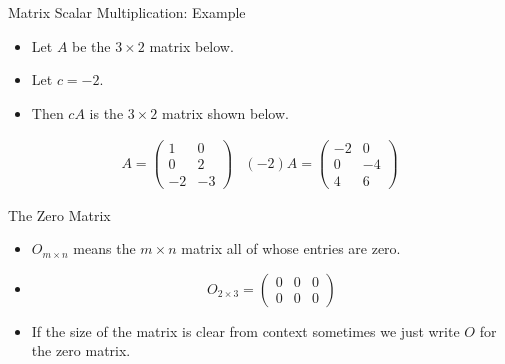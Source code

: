 \documentclass{beamer}
\begin{document}
\begin{frame}{Matrix Scalar Multiplication: Example}

\begin{itemize}
\item Let $A$ be the $3\times 2$ matrix below.
\item Let $c = -2$.
\item Then $cA$ is the $3\times 2$ matrix shown below.
\end{itemize}

$$
\begin{matrix}
A =

\begin{pmatrix}
1 & 0 \\
0 & 2 \\
-2 & -3
\end{pmatrix}

&

(-2) A =

\begin{pmatrix}
-2 & 0 \\
0 & -4 \\
4 &  6
\end{pmatrix}

\end{matrix}
$$

\end{frame}


\begin{frame}{The Zero Matrix}

\begin{itemize}
\item $O_{m\times n}$ means the $m\times n$ matrix all of whose entries are zero.
\item
$$O_{2\times 3} =
\begin{pmatrix}
0 & 0 & 0 \\
0 & 0 & 0
\end{pmatrix}
$$
\item If the size of the matrix is clear from context sometimes we just
write $O$ for the zero matrix.
\end{itemize}

\end{frame}

\end{document}
